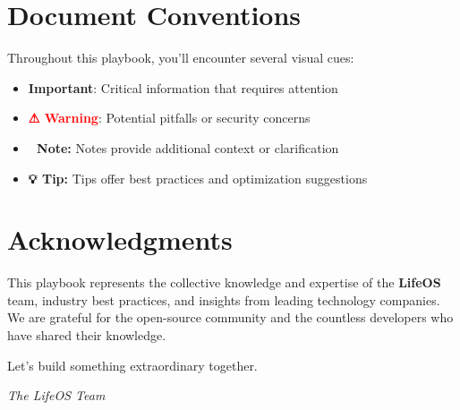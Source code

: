 \documentclass[12pt,a4paper,twoside,openright]{book}
\newcommand{\lifeos}{\textbf{LifeOS}}
\newcommand{\important}[1]{\textcolor{primaryblue}{\textbf{#1}}}
\newcommand{\warning}[1]{\textcolor{red}{\textbf{⚠ #1}}}
\newcommand{\note}[1]{\textcolor{codegreen}{\textbf{📝 Note:} #1}}
\newcommand{\tip}[1]{\textcolor{codeorange}{\textbf{💡 Tip:} #1}}
\begin{document}
\section*{Document Conventions}

Throughout this playbook, you'll encounter several visual cues:

\begin{itemize}
    \item \important{Important}: Critical information that requires attention
    \item \warning{Warning}: Potential pitfalls or security concerns
    \item \note{Notes provide additional context or clarification}
    \item \tip{Tips offer best practices and optimization suggestions}
\end{itemize}

\section*{Acknowledgments}

This playbook represents the collective knowledge and expertise of the \lifeos{} team, industry best practices, and insights from leading technology companies. We are grateful for the open-source community and the countless developers who have shared their knowledge.

\vspace{1cm}
\noindent Let's build something extraordinary together.

\vspace{0.5cm}
\noindent\textit{The LifeOS Team}

\tableofcontents
\listoffigures
\listoftables
\lstlistoflistings

\mainmatter


















\end{document}
